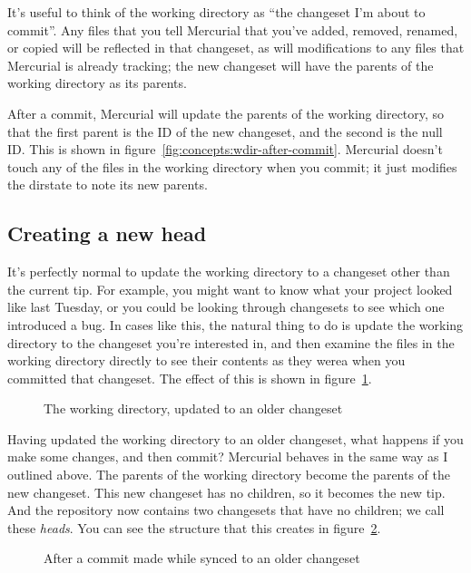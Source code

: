 It's useful to think of the working directory as ``the changeset I'm
about to commit''.  Any files that you tell Mercurial that you've
added, removed, renamed, or copied will be reflected in that
changeset, as will modifications to any files that Mercurial is
already tracking; the new changeset will have the parents of the
working directory as its parents.

After a commit, Mercurial will update the parents of the working
directory, so that the first parent is the ID of the new changeset,
and the second is the null ID.  This is shown in
figure~\ref{fig:concepts:wdir-after-commit}.  Mercurial doesn't touch
any of the files in the working directory when you commit; it just
modifies the dirstate to note its new parents.

\subsection{Creating a new head}

It's perfectly normal to update the working directory to a changeset
other than the current tip.  For example, you might want to know what
your project looked like last Tuesday, or you could be looking through
changesets to see which one introduced a bug.  In cases like this, the
natural thing to do is update the working directory to the changeset
you're interested in, and then examine the files in the working
directory directly to see their contents as they werea when you
committed that changeset.  The effect of this is shown in
figure~\ref{fig:concepts:wdir-pre-branch}.

\begin{figure}[ht]
  \centering
  \caption{The working directory, updated to an older changeset}
  \label{fig:concepts:wdir-pre-branch}
\end{figure}

Having updated the working directory to an older changeset, what
happens if you make some changes, and then commit?  Mercurial behaves
in the same way as I outlined above.  The parents of the working
directory become the parents of the new changeset.  This new changeset
has no children, so it becomes the new tip.  And the repository now
contains two changesets that have no children; we call these
\emph{heads}.  You can see the structure that this creates in
figure~\ref{fig:concepts:wdir-branch}.

\begin{figure}[ht]
  \centering
  \caption{After a commit made while synced to an older changeset}
  \label{fig:concepts:wdir-branch}
\end{figure}

